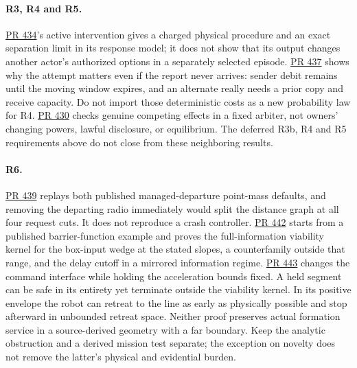 \documentclass[11pt]{article}
\newcommand{\pr}[1]{\href{https://github.com/eternal-november/eos-research-programmes/pull/#1}{PR #1}}
\begin{document}
\paragraph{R3, R4 and R5.}
\pr{434}'s active intervention gives a charged physical procedure and an exact separation limit in its response model; it does not show that its output changes another actor's authorized options in a separately selected episode. \pr{437} shows why the attempt matters even if the report never arrives: sender debit remains until the moving window expires, and an alternate really needs a prior copy and receive capacity. Do not import those deterministic costs as a new probability law for R4. \pr{430} checks genuine competing effects in a fixed arbiter, not owners' changing powers, lawful disclosure, or equilibrium. The deferred R3b, R4 and R5 requirements above do not close from these neighboring results.

\paragraph{R6.}
\pr{439} replays both published managed-departure point-mass defaults, and removing the departing radio immediately would split the distance graph at all four request cuts. It does not reproduce a crash controller. \pr{442} starts from a published barrier-function example and proves the full-information viability kernel for the box-input wedge at the stated slopes, a counterfamily outside that range, and the delay cutoff in a mirrored information regime. \pr{443} changes the command interface while holding the acceleration bounds fixed. A held segment can be safe in its entirety yet terminate outside the viability kernel. In its positive envelope the robot can retreat to the line as early as physically possible and stop afterward in unbounded retreat space. Neither proof preserves actual formation service in a source-derived geometry with a far boundary. Keep the analytic obstruction and a derived mission test separate; the exception on novelty does not remove the latter's physical and evidential burden.
\end{document}
